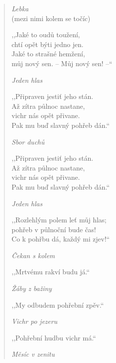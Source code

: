 \begin{verse}
\smallskip

\textit{Lebka} \\
(mezi nimi kolem se točíc)

\smallskip

,,Jaké to oudů toužení, \\
chtí opět býti jedno jen. \\
Jaké to strašné hemžení, \\
můj nový sen. -- Můj nový sen! --``

\smallskip

\textit{Jeden hlas}

\smallskip

,,Připraven jestiť jeho stán. \\
Až zítra půlnoc nastane, \\
vichr nás opět přivane. \\
Pak mu buď slavný pohřeb dán.``

\smallskip

\textit{Sbor duchů}

\smallskip

,,Připraven jestiť jeho stán. \\
Až zítra půlnoc nastane, \\
vichr nás opět přivane. \\
Pak mu buď slavný pohřeb dán.``

\pagebreak

\textit{Jeden hlas}

\smallskip

,,Rozlehlým polem leť můj hlas; \\
pohřeb v půlnoční bude čas! \\
Co k pohřbu dá, každý mi zjev!``

\smallskip

\textit{Čekan s kolem}

\smallskip

,,Mrtvému rakví budu já.``

\smallskip

\textit{Žáby z bažiny}

\smallskip

,,My odbudem pohřební zpěv.``

\smallskip

\textit{Vichr po jezeru}

\smallskip

,,Pohřební hudbu vichr má.``

\smallskip

\textit{Měsíc v zenitu}


\end{verse}
